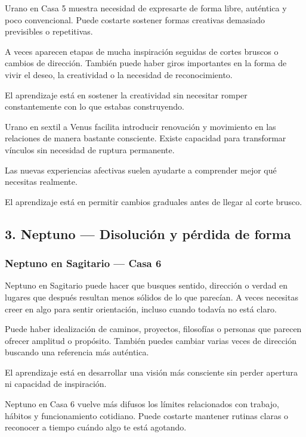 \documentclass[11pt,a4paper]{article}
\begin{document}
Urano en Casa 5 muestra necesidad de expresarte de forma libre, auténtica y poco convencional. Puede costarte sostener formas creativas demasiado previsibles o repetitivas.

A veces aparecen etapas de mucha inspiración seguidas de cortes bruscos o cambios de dirección. También puede haber giros importantes en la forma de vivir el deseo, la creatividad o la necesidad de reconocimiento.

El aprendizaje está en sostener la creatividad sin necesitar romper constantemente con lo que estabas construyendo.

Urano en sextil a Venus facilita introducir renovación y movimiento en las relaciones de manera bastante consciente. Existe capacidad para transformar vínculos sin necesidad de ruptura permanente.

Las nuevas experiencias afectivas suelen ayudarte a comprender mejor qué necesitas realmente.

El aprendizaje está en permitir cambios graduales antes de llegar al corte brusco.

\vspace{0.8cm}

\subsection{3. Neptuno — Disolución y pérdida de forma}

\subsubsection*{Neptuno en Sagitario — Casa 6}

Neptuno en Sagitario puede hacer que busques sentido, dirección o verdad en lugares que después resultan menos sólidos de lo que parecían. A veces necesitas creer en algo para sentir orientación, incluso cuando todavía no está claro.

Puede haber idealización de caminos, proyectos, filosofías o personas que parecen ofrecer amplitud o propósito. También puedes cambiar varias veces de dirección buscando una referencia más auténtica.

El aprendizaje está en desarrollar una visión más consciente sin perder apertura ni capacidad de inspiración.

Neptuno en Casa 6 vuelve más difusos los límites relacionados con trabajo, hábitos y funcionamiento cotidiano. Puede costarte mantener rutinas claras o reconocer a tiempo cuándo algo te está agotando.
\end{document}
